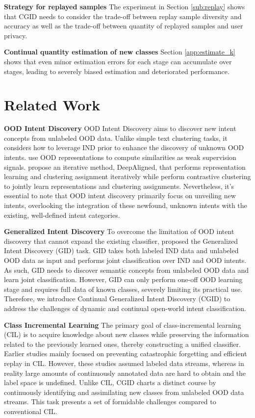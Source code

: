 \documentclass[11pt]{article}
\begin{document}
\textbf{Strategy for replayed samples} The experiment in Section \ref{sub:replay} shows that CGID needs to consider the trade-off between replay sample diversity and accuracy as well as the trade-off between quantity of replayed samples and user privacy.

\textbf{Continual quantity estimation of new classes} Section \ref{app:estimate_k} shows that even minor estimation errors for each stage can accumulate over stages, leading to severely biased estimation and deteriorated performance.

\section{Related Work}

\textbf{OOD Intent Discovery} OOD Intent Discovery aims to discover new intent concepts from unlabeled OOD data. Unlike simple text clustering tasks, it considers how to leverage IND prior to enhance the discovery of unknown OOD intents. \citet{lin2020discovering} use OOD representations to compute similarities as weak supervision signals. \citet{zhang2021discovering} propose an iterative method, DeepAligned, that performs representation learning and clustering assignment iteratively while \citet{mou-etal-2022-disentangled} perform contrastive clustering to jointly learn representations and clustering assignments. Nevertheless, it's essential to note that OOD intent discovery primarily focus on unveiling new intents, overlooking the integration of these newfound, unknown intents with the existing, well-defined intent categories.


\textbf{Generalized Intent Discovery} To overcome the limitation of OOD intent discovery that cannot expand the existing classifier, \citet{mou-etal-2022-generalized} proposed the Generalized Intent Discovery (GID) task. GID takes both labeled IND data and unlabeled OOD data as input and performs joint classification over IND and OOD intents. As such, GID needs to discover semantic concepts from unlabeled OOD data and learn joint classification. However, GID can only perform one-off OOD learning stage and requires full data of known classes, severely limiting its practical use. Therefore, we introduce Continual Generalized Intent Discovery (CGID) to address the challenges of dynamic and continual open-world intent classification. 

\textbf{Class Incremental Learning} The primary goal of class-incremental learning (CIL) is to acquire knowledge about new classes while preserving the information related to the previously learned ones, thereby constructing a unified classifier. Earlier studies \cite{ke-etal-2021-adapting,geng2021iterative,li-etal-2022-continual} mainly focused on preventing catastrophic forgetting and efficient replay in CIL. However, these studies assumed labeled data streams, whereas in reality large amounts of continuously annotated data are hard to obtain and the label space is undefined. Unlike CIL, CGID charts a distinct course by continuously identifying and assimilating new classes from unlabeled OOD data streams. This task presents a set of formidable challenges compared to conventional CIL.
\end{document}
